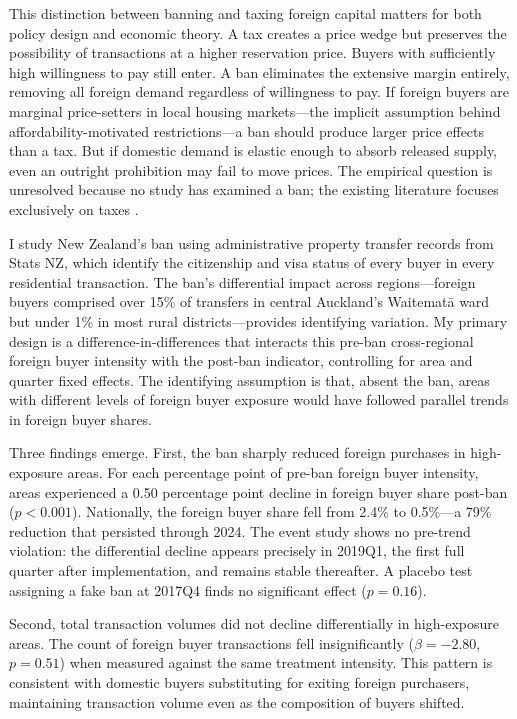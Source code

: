 \documentclass[12pt]{article}
\begin{document}
This distinction between banning and taxing foreign capital matters for both policy design and economic theory. A tax creates a price wedge but preserves the possibility of transactions at a higher reservation price. Buyers with sufficiently high willingness to pay still enter. A ban eliminates the extensive margin entirely, removing all foreign demand regardless of willingness to pay. If foreign buyers are marginal price-setters in local housing markets---the implicit assumption behind affordability-motivated restrictions---a ban should produce larger price effects than a tax. But if domestic demand is elastic enough to absorb released supply, even an outright prohibition may fail to move prices. The empirical question is unresolved because no study has examined a ban; the existing literature focuses exclusively on taxes \citep{favilukis2021housing,pavlov2024foreign,best2022housing}.

I study New Zealand's ban using administrative property transfer records from Stats NZ, which identify the citizenship and visa status of every buyer in every residential transaction. The ban's differential impact across regions---foreign buyers comprised over 15\% of transfers in central Auckland's Waitemat\=a ward but under 1\% in most rural districts---provides identifying variation. My primary design is a difference-in-differences that interacts this pre-ban cross-regional foreign buyer intensity with the post-ban indicator, controlling for area and quarter fixed effects. The identifying assumption is that, absent the ban, areas with different levels of foreign buyer exposure would have followed parallel trends in foreign buyer shares.

Three findings emerge. First, the ban sharply reduced foreign purchases in high-exposure areas. For each percentage point of pre-ban foreign buyer intensity, areas experienced a 0.50 percentage point decline in foreign buyer share post-ban ($p < 0.001$). Nationally, the foreign buyer share fell from 2.4\% to 0.5\%---a 79\% reduction that persisted through 2024. The event study shows no pre-trend violation: the differential decline appears precisely in 2019Q1, the first full quarter after implementation, and remains stable thereafter. A placebo test assigning a fake ban at 2017Q4 finds no significant effect ($p = 0.16$).

Second, total transaction volumes did not decline differentially in high-exposure areas. The count of foreign buyer transactions fell insignificantly ($\beta = -2.80$, $p = 0.51$) when measured against the same treatment intensity. This pattern is consistent with domestic buyers substituting for exiting foreign purchasers, maintaining transaction volume even as the composition of buyers shifted.
\end{document}
